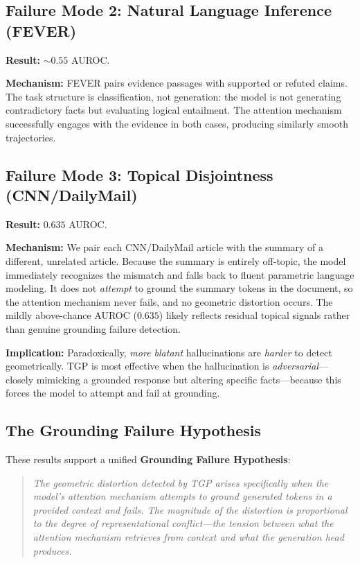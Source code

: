 \documentclass[10pt]{article}
\newcommand{\tgp}{\textsc{TGP}\xspace}
\begin{document}
\subsection{Failure Mode 2: Natural Language Inference (FEVER)}
\label{sec:failure-nli}

\textbf{Result:} ${\sim}0.55$ AUROC.

\textbf{Mechanism:}
FEVER pairs evidence passages with supported or refuted claims.
The task structure is classification, not generation: the model is not generating contradictory facts but evaluating logical entailment.
The attention mechanism successfully engages with the evidence in both cases, producing similarly smooth trajectories.

\subsection{Failure Mode 3: Topical Disjointness (CNN/DailyMail)}
\label{sec:failure-disjoint}

\textbf{Result:} $0.635$ AUROC.

\textbf{Mechanism:}
We pair each CNN/DailyMail article with the summary of a different, unrelated article.
Because the summary is entirely off-topic, the model immediately recognizes the mismatch and falls back to fluent parametric language modeling.
It does not \emph{attempt} to ground the summary tokens in the document, so the attention mechanism never fails, and no geometric distortion occurs.
The mildly above-chance AUROC ($0.635$) likely reflects residual topical signals rather than genuine grounding failure detection.

\textbf{Implication:}
Paradoxically, \emph{more blatant} hallucinations are \emph{harder} to detect geometrically.
\tgp is most effective when the hallucination is \emph{adversarial}---closely mimicking a grounded response but altering specific facts---because this forces the model to attempt and fail at grounding.

\subsection{The Grounding Failure Hypothesis}
\label{sec:hypothesis}

These results support a unified \textbf{Grounding Failure Hypothesis}:

\begin{quote}
\emph{The geometric distortion detected by \tgp arises specifically when the model's attention mechanism attempts to ground generated tokens in a provided context and fails.
The magnitude of the distortion is proportional to the degree of representational conflict---the tension between what the attention mechanism retrieves from context and what the generation head produces.}
\end{quote}
\end{document}

